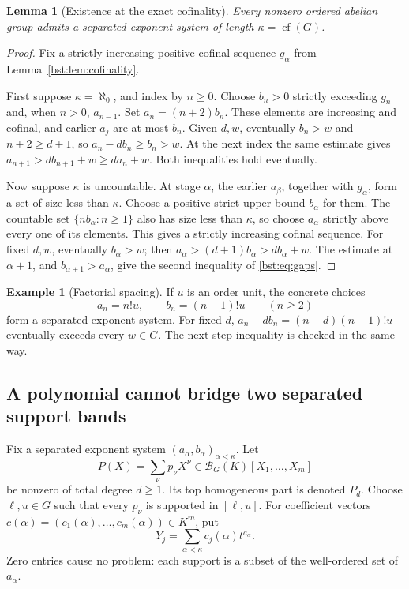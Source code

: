 \documentclass[11pt,letterpaper]{article}
\newtheorem{lemma}[theorem]{Lemma}
\theoremstyle{definition}
\newtheorem{example}[theorem]{Example}
\theoremstyle{remark}
\newcommand{\cof}{\operatorname{cf}}
\newcommand{\BB}[2]{\mathcal B_{#2}(#1)}
\begin{document}
\begin{lemma}[Existence at the exact cofinality]\label{bst:lem:skeleton}
Every nonzero ordered abelian group admits a separated exponent system of
length $\kappa=\cof(G)$.
\end{lemma}
\begin{proof}
Fix a strictly increasing positive cofinal sequence $g_\alpha$ from
Lemma~\ref{bst:lem:cofinality}.

First suppose $\kappa=\aleph_0$, and index by $n\ge0$. Choose $b_n>0$
strictly exceeding $g_n$ and, when $n>0$, $a_{n-1}$. Set
$a_n=(n+2)b_n$. These elements are increasing and cofinal, and earlier
$a_j$ are at most $b_n$. Given $d,w$, eventually $b_n>w$ and $n+2\ge d+1$,
so $a_n-d b_n\ge b_n>w$. At the next index the same estimate gives
$a_{n+1}>d b_{n+1}+w\ge d a_n+w$. Both inequalities hold eventually.

Now suppose $\kappa$ is uncountable. At stage $\alpha$, the earlier
$a_\beta$, together with $g_\alpha$, form a set of size less than $\kappa$.
Choose a positive strict upper bound $b_\alpha$ for them. The countable set
$\{n b_\alpha:n\ge1\}$ also has size less than $\kappa$, so choose
$a_\alpha$ strictly above every one of its elements. This gives a strictly
increasing cofinal sequence. For fixed $d,w$, eventually $b_\alpha>w$;
then
$a_\alpha>(d+1)b_\alpha>d b_\alpha+w$.
The estimate at $\alpha+1$, and $b_{\alpha+1}>a_\alpha$, give the second
inequality of \eqref{bst:eq:gaps}.
\end{proof}

\begin{example}[Factorial spacing]
If $u$ is an order unit, the concrete choices
\[
 a_n=n!u,\qquad b_n=(n-1)!u\qquad(n\ge2)
\]
form a separated exponent system. For fixed $d$,
$a_n-d b_n=(n-d)(n-1)!u$ eventually exceeds every $w\in G$.
The next-step inequality is checked in the same way.
\end{example}

\subsection{A polynomial cannot bridge two separated support bands}

Fix a separated exponent system $(a_\alpha,b_\alpha)_{\alpha<\kappa}$.
Let
\[
 P(X)=\sum_{\nu}p_\nu X^\nu\in\BB KG[X_1,\ldots,X_m]
\]
be nonzero of total degree $d\ge1$. Its top homogeneous part is denoted
$P_d$. Choose $\ell,u\in G$ such that every $p_\nu$ is supported in
$[\ell,u]$. For coefficient vectors
$c(\alpha)=(c_1(\alpha),\ldots,c_m(\alpha))\in K^m$, put
\[
 Y_j=\sum_{\alpha<\kappa}c_j(\alpha)t^{a_\alpha}.
\]
Zero entries cause no problem: each support is a subset of the well-ordered
set of $a_\alpha$.
\end{document}
